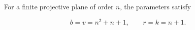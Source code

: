 For a finite projective plane of order $n$, the parameters satisfy

$$b = v = n^2 + n + 1, \qquad r = k = n + 1.$$
